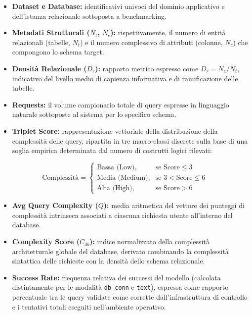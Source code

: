 \begin{itemize}
\item
  \textbf{Dataset e Database:} identificativi univoci del dominio
  applicativo e dell'istanza relazionale sottoposta a benchmarking.
\item
  \textbf{Metadati Strutturali (\(N_t\), \(N_c\)):} rispettivamente, il
  numero di entità relazionali (tabelle, \(N_t\)) e il numero
  complessivo di attributi (colonne, \(N_c\)) che compongono lo schema
  target.
\item
  \textbf{Densità Relazionale (\(D_r\)):} rapporto metrico espresso come
  \(D_r = N_c / N_t\), indicativo del livello medio di capienza
  informativa e di ramificazione delle tabelle.
\item
  \textbf{Requests:} il volume campionario totale di query espresse in
  linguaggio naturale sottoposte al sistema per lo specifico schema.
\item
  \textbf{Triplet Score:} rappresentazione vettoriale della
  distribuzione della complessità delle query, ripartita in tre
  macro-classi discrete sulla base di una soglia empirica determinata
  dal numero di costrutti logici rilevati:
\end{itemize}

\[
\text{Complessità} = 
\begin{cases} 
\text{Bassa (Low)}, & \text{se Score} \leq 3 \\ 
\text{Media (Medium)}, & \text{se } 3 < \text{Score} \leq 6 \\ 
\text{Alta (High)}, & \text{se Score} > 6 
\end{cases}
\]

\begin{itemize}
\item
  \textbf{Avg Query Complexity (\(Q\)):} media aritmetica del vettore
  dei punteggi di complessità intrinseca associati a ciascuna richiesta
  utente all'interno del database.
\item
  \textbf{Complexity Score (\(C_{db}\)):} indice normalizzato della
  complessità architetturale globale del database, derivato combinando
  la complessità sintattica delle richieste con la densità dello schema
  relazionale.
\item
  \textbf{Success Rate:} frequenza relativa dei successi del modello
  (calcolata distintamente per le modalità \texttt{db\_conn} e
  \texttt{text}), espressa come rapporto percentuale tra le query
  validate come corrette dall'infrastruttura di controllo e i tentativi
  totali eseguiti nell'ambiente operativo.
\end{itemize}

